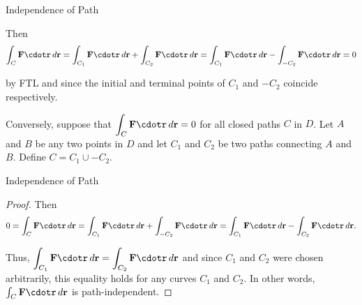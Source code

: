 \documentclass[11pt,english,
handout
]{beamer}
\begin{document}
\begin{frame}[t]{Independence of Path}
\small
\begin{proofs}
Then
\[
\int_C\mathbf{F}\cdotr\,d\mathbf{r}=\int_{C_1}\mathbf{F}\cdotr\,d\mathbf{r}+\int_{C_2}\mathbf{F}\cdotr\,d\mathbf{r}=\int_{C_1}\mathbf{F}\cdotr\,d\mathbf{r}-\int_{-C_2}\mathbf{F}\cdotr\,d\mathbf{r}=0
\]

by FTL and since the initial and terminal points of $C_1$ and $-C_2$ coincide respectively.

\lspace
Conversely, suppose that $\displaystyle \int_C\mathbf{F}\cdotr\,d\mathbf{r}=0$ for all closed paths $C$ in $D$. \pause Let $A$ and $B$ be any two points in $D$ and let $C_1$ and $C_2$ be two paths connecting $A$ and $B$. Define $C=C_1\cup -C_2$. \end{proofs}
\end{frame}










\begin{frame}[t]{Independence of Path}
\small
\begin{proof}
Then
\[
0=\int_C\mathbf{F}\cdotr\,d\mathbf{r}=\int_{C_1}\mathbf{F}\cdotr\,d\mathbf{r}+\int_{-C_2}\mathbf{F}\cdotr\,d\mathbf{r}=\int_{C_1}\mathbf{F}\cdotr\,d\mathbf{r}-\int_{C_2}\mathbf{F}\cdotr\,d\mathbf{r}.
\]\pause

Thus, $\displaystyle \int_{C_1}\mathbf{F}\cdotr\,d\mathbf{r}=\int_{C_2}\mathbf{F}\cdotr\,d\mathbf{r}$ and since $C_1$ and $C_2$ were chosen arbitrarily, this equality holds for any curves $C_1$ and $C_2$. In other words, $\int_C\mathbf{F}\cdotr\,d\mathbf{r}$ is path-independent.
\end{proof}
\end{frame}
\end{document}
